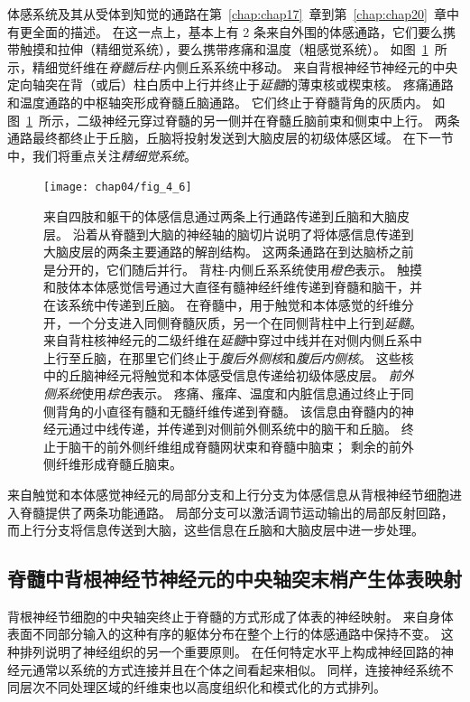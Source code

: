 体感系统及其从受体到知觉的通路在第~\ref{chap:chap17}~章到第~\ref{chap:chap20}~章中有更全面的描述。
在这一点上，基本上有 2 条来自外围的体感通路，它们要么携带触摸和拉伸（精细觉系统），要么携带疼痛和温度（粗感觉系统）。
如图~\ref{fig:4_6}~所示，精细觉纤维在\textit{脊髓后柱}-内侧丘系系统中移动。
来自背根神经节神经元的中央定向轴突在背（或后）柱白质中上行并终止于\textit{延髓}的薄束核或楔束核。
疼痛通路和温度通路的中枢轴突形成脊髓丘脑通路。
它们终止于脊髓背角的灰质内。
如图~\ref{fig:4_6}~所示，二级神经元穿过脊髓的另一侧并在脊髓丘脑前束和侧束中上行。 
两条通路最终都终止于丘脑，丘脑将投射发送到大脑皮层的初级体感区域。
在下一节中，我们将重点关注\textit{精细觉系统}。


\begin{figure}[htbp]
	\centering
	\texttt{[image: chap04/fig\_4\_6]}
	\caption{来自四肢和躯干的体感信息通过两条上行通路传递到丘脑和大脑皮层。
		沿着从脊髓到大脑的神经轴的脑切片说明了将体感信息传递到大脑皮层的两条主要通路的解剖结构。
		这两条通路在到达脑桥之前是分开的，它们随后并行。
		背柱-内侧丘系系统使用\textit{橙色}表示。
		触摸和肢体本体感觉信号通过大直径有髓神经纤维传递到脊髓和脑干，并在该系统中传递到丘脑。
		在脊髓中，用于触觉和本体感觉的纤维分开，一个分支进入同侧脊髓灰质，另一个在同侧背柱中上行到\textit{延髓}。 
		来自背柱核神经元的二级纤维在\textit{延髓}中穿过中线并在对侧内侧丘系中上行至丘脑，在那里它们终止于\textit{腹后外侧核}和\textit{腹后内侧核}。
		这些核中的丘脑神经元将触觉和本体感受信息传递给初级体感皮层。
		\textit{前外侧系统}使用\textit{棕色}表示。
		疼痛、瘙痒、温度和内脏信息通过终止于同侧背角的小直径有髓和无髓纤维传递到脊髓。
		该信息由脊髓内的神经元通过中线传递，并传递到对侧前外侧系统中的脑干和丘脑。
		终止于脑干的前外侧纤维组成脊髓网状束和脊髓中脑束；
		剩余的前外侧纤维形成脊髓丘脑束。}
	\label{fig:4_6}
\end{figure}

来自触觉和本体感觉神经元的局部分支和上行分支为体感信息从背根神经节细胞进入脊髓提供了两条功能通路。
局部分支可以激活调节运动输出的局部反射回路，而上行分支将信息传送到大脑，这些信息在丘脑和大脑皮层中进一步处理。



\subsection{脊髓中背根神经节神经元的中央轴突末梢产生体表映射}

背根神经节细胞的中央轴突终止于脊髓的方式形成了体表的神经映射。
来自身体表面不同部分输入的这种有序的躯体分布在整个上行的体感通路中保持不变。
这种排列说明了神经组织的另一个重要原则。
在任何特定水平上构成神经回路的神经元通常以系统的方式连接并且在个体之间看起来相似。 
同样，连接神经系统不同层次不同处理区域的纤维束也以高度组织化和模式化的方式排列。



